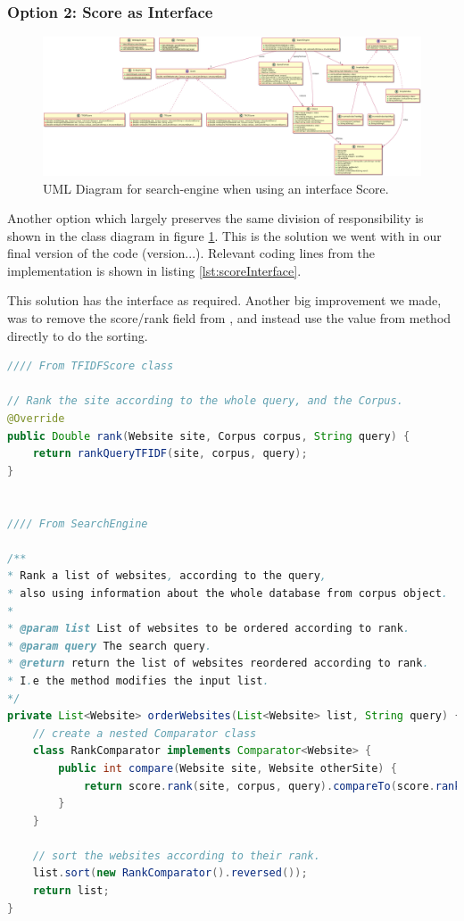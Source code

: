 \subsubsection{Option 2: Score as Interface}
\begin{figure}[t]
	\centering
	\includegraphics[width=\textwidth]{graphics/uml/ScoreAsInterface.png}
	\caption{UML Diagram for search-engine when using an interface Score.}
	\label{fig:uml:ScoreAsInterface}
\end{figure}
Another option which largely preserves the same division of responsibility is shown in the class diagram in figure \ref{fig:uml:ScoreAsInterface}.    
This is the solution we went with in our final version of the code (version...). Relevant coding lines from the implementation is shown in listing \ref{lst:scoreInterface}.

This solution has the  interface as required. Another big improvement we made, was to remove the score/rank field from , and instead use the value from  method directly to do the sorting.  


\begin{lstlisting}[language={Java}, caption={This is a code example.}, label={lst:scoreInterface}]
//// From TFIDFScore class 

// Rank the site according to the whole query, and the Corpus.
@Override
public Double rank(Website site, Corpus corpus, String query) {
	return rankQueryTFIDF(site, corpus, query);
}


//// From SearchEngine 

/**
* Rank a list of websites, according to the query, 
* also using information about the whole database from corpus object. 
*
* @param list List of websites to be ordered according to rank.
* @param query The search query.
* @return return the list of websites reordered according to rank.
* I.e the method modifies the input list.  
*/
private List<Website> orderWebsites(List<Website> list, String query) {
	// create a nested Comparator class
	class RankComparator implements Comparator<Website> {
		public int compare(Website site, Website otherSite) {
			return score.rank(site, corpus, query).compareTo(score.rank(otherSite, corpus, query));
		}
	}

	// sort the websites according to their rank.
	list.sort(new RankComparator().reversed());     
	return list;
}
\end{lstlisting}



